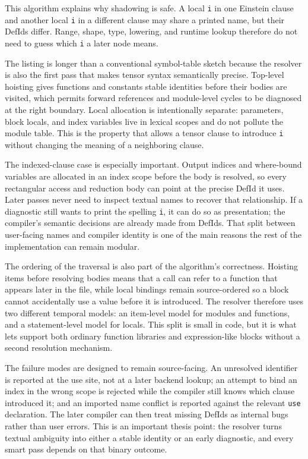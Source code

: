 This algorithm explains why shadowing is safe. A local \texttt{i} in one
Einstein clause and another local \texttt{i} in a different clause may share a
printed name, but their DefIds differ. Range, shape, type, lowering, and
runtime lookup therefore do not need to guess which \texttt{i} a later node
means.

The listing is longer than a conventional symbol-table sketch because the
resolver is also the first pass that makes tensor syntax semantically precise.
Top-level hoisting gives functions and constants stable identities before their
bodies are visited, which permits forward references and module-level cycles to
be diagnosed at the right boundary. Local allocation is intentionally separate:
parameters, block locals, and index variables live in lexical scopes and do not
pollute the module table. This is the property that allows a tensor clause to
introduce \texttt{i} without changing the meaning of a neighboring clause.

The indexed-clause case is especially important. Output indices and
where-bound variables are allocated in an index scope before the body is
resolved, so every rectangular access and reduction body can point at the
precise DefId it uses. Later passes never need to inspect textual names to
recover that relationship. If a diagnostic still wants to print the spelling
\texttt{i}, it can do so as presentation; the compiler's semantic decisions are
already made from DefIds. That split between user-facing names and compiler
identity is one of the main reasons the rest of the implementation can remain
modular.

The ordering of the traversal is also part of the algorithm's correctness.
Hoisting items before resolving bodies means that a call can refer to a
function that appears later in the file, while local bindings remain
source-ordered so a block cannot accidentally use a value before it is
introduced. The resolver therefore uses two different temporal models: an
item-level model for modules and functions, and a statement-level model for
locals. This split is small in code, but it is what lets \einlang{} support both
ordinary function libraries and expression-like blocks without a second
resolution mechanism.

The failure modes are designed to remain source-facing. An unresolved
identifier is reported at the use site, not at a later backend lookup; an
attempt to bind an index in the wrong scope is rejected while the compiler still
knows which clause introduced it; and an imported name conflict is reported
against the relevant \texttt{use} declaration. The later compiler can then
treat missing DefIds as internal bugs rather than user errors. This is an
important thesis point: the resolver turns textual ambiguity into either a
stable identity or an early diagnostic, and every smart pass depends on that
binary outcome.

